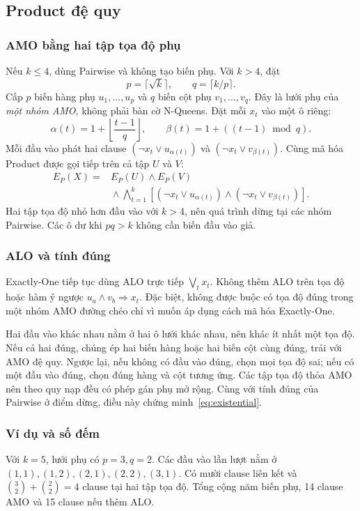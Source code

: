 \subsection{Product đệ quy}
\label{sec:product}
\subsubsection{AMO bằng hai tập tọa độ phụ}
Nếu $k\le4$, dùng Pairwise và không tạo biến phụ. Với $k>4$, đặt
\begin{equation}
p=\lceil\sqrt{k}\rceil,\qquad q=\lceil k/p\rceil.
\end{equation}
Cấp $p$ biến hàng phụ $u_1,\ldots,u_p$ và $q$ biến cột phụ $v_1,\ldots,v_q$. Đây là lưới phụ của \emph{một nhóm AMO}, không phải bàn cờ N-Queens. Đặt mỗi $x_t$ vào một ô riêng:
\[
\alpha(t)=1+\left\lfloor\frac{t-1}{q}\right\rfloor,\qquad
\beta(t)=1+((t-1)\bmod q).
\]
Mỗi đầu vào phát hai clause $(\neg x_t\lor u_{\alpha(t)})$ và $(\neg x_t\lor v_{\beta(t)})$. Cùng mã hóa Product được gọi tiếp trên cả tập $U$ và $V$:
\begin{equation}
\begin{split}
E_P(X)={}&E_P(U)\land E_P(V)\\
&{}\land\bigwedge_{t=1}^{k}
[(\neg x_t\lor u_{\alpha(t)})\land(\neg x_t\lor v_{\beta(t)})].
\end{split}
\label{eq:product}
\end{equation}
Hai tập tọa độ nhỏ hơn đầu vào với $k>4$, nên quá trình dừng tại các nhóm Pairwise. Các ô dư khi $pq>k$ không cần biến đầu vào giả.

\subsubsection{ALO và tính đúng}
Exactly-One tiếp tục dùng ALO trực tiếp $\bigvee_t x_t$. Không thêm ALO trên tọa độ hoặc hàm ý ngược $u_a\land v_b\Rightarrow x_t$. Đặc biệt, không được buộc có tọa độ đúng trong một nhóm AMO đường chéo chỉ vì muốn áp dụng cách mã hóa Exactly-One.

Hai đầu vào khác nhau nằm ở hai ô lưới khác nhau, nên khác ít nhất một tọa độ. Nếu cả hai đúng, chúng ép hai biến hàng hoặc hai biến cột cùng đúng, trái với AMO đệ quy. Ngược lại, nếu không có đầu vào đúng, chọn mọi tọa độ sai; nếu có một đầu vào đúng, chọn đúng hàng và cột tương ứng. Các tập tọa độ thỏa AMO nên theo quy nạp đều có phép gán phụ mở rộng. Cùng với tính đúng của Pairwise ở điểm dừng, điều này chứng minh~\eqref{eq:existential}.

\subsubsection{Ví dụ và số đếm}
Với $k=5$, lưới phụ có $p=3,q=2$. Các đầu vào lần lượt nằm ở $(1,1),(1,2),(2,1),(2,2),(3,1)$. Có mười clause liên kết và $\binom32+\binom22=4$ clause tại hai tập tọa độ. Tổng cộng năm biến phụ, 14 clause AMO và 15 clause nếu thêm ALO.

